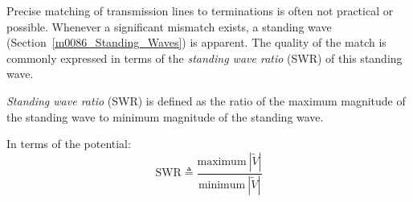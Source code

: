 

\label{m0081_Standing_Wave_Ratio}  %

Precise matching of transmission lines to terminations is often not practical or possible.
Whenever a significant mismatch exists, a standing wave (Section~\ref{m0086_Standing_Waves}) is apparent.
The quality of the match is commonly expressed in terms of the \emph{standing wave ratio} (SWR) of this standing wave. 
%
\begin{mdframed}[backgroundcolor=yellow!20,nobreak=true] 
\emph{Standing wave ratio} 
(SWR) is defined as the ratio of the maximum magnitude of the standing wave to minimum magnitude of the standing wave.
\end{mdframed}
%
In terms of the potential:
%
\begin{equation}
\boxed{
\mbox{SWR} \triangleq \frac{\mbox{maximum}~|\widetilde{V}|}{\mbox{minimum}~|\widetilde{V}|}
}
\end{equation}  


